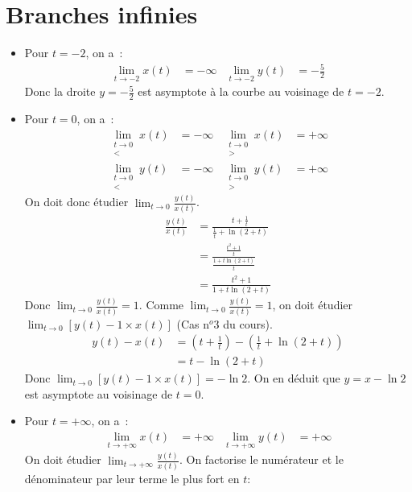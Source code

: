 \documentclass{article}
\begin{document}
\section{Branches infinies}
\begin{itemize}
\item Pour $t=-2$, on a~:
\begin{align*}
        \lim_{t\to -2} x(t)              & = -\infty &
        \lim_{t\to -2} y(t)              & = -\frac{5}{2}
\end{align*}
Donc la droite $y=-\frac{5}{2}$ est asymptote à la courbe au voisinage de $t=-2$.
\item Pour $t=0$, on a~:
\begin{align*}
        \lim_{\substack{t\to 0\\<}} x(t) & = -\infty &
        \lim_{\substack{t\to 0\\>}} x(t) & = +\infty \\
        \lim_{\substack{t\to 0\\<}} y(t) & = -\infty &
        \lim_{\substack{t\to 0\\>}} y(t) & = +\infty
\end{align*}
                On doit donc étudier $\lim_{t\to 0}\frac{y(t)}{x(t)}$.
\begin{align*}
        \frac{y(t)}{x(t)} &= \frac{t+\frac{1}{t}}{\frac{1}{t}+\ln(2+t)}\\
                          &= \frac{\frac{t^2+1}{t}}{\frac{1+t\ln(2+t)}{t}} \\
                          &= \frac{t^2+1}{1+t\ln(2+t)}
\end{align*}
Donc $\lim_{t\to 0}\frac{y(t)}{x(t)}=1$.
                Comme $\lim_{t\to 0}\frac{y(t)}{x(t)}=1$, on doit étudier
                $\lim_{t\to 0}[y(t)-1\times x(t)]$ (Cas n$^o$3 du cours).
\begin{align*}
        y(t)-x(t) & = (t+\frac{1}{t})-(\frac{1}{t}+\ln(2+t))\\
                  & = t-\ln(2+t)
\end{align*}
                Donc $\lim_{t\to 0}[y(t)-1\times x(t)]=-\ln 2$.
                On en déduit que $y=x-\ln 2$ est asymptote au voisinage de $t=0$.
\item Pour $t=+\infty$, on a~:
\begin{align*}
        \lim_{{t\to +\infty}}       x(t) & = +\infty &
        \lim_{{t\to +\infty}}       y(t) & = +\infty 
\end{align*}
On doit étudier $\lim_{t\to +\infty}\frac{y(t)}{x(t)}$.
On factorise le numérateur et le dénominateur par leur terme le plus fort en $t$:

\end{itemize}
\end{document}

